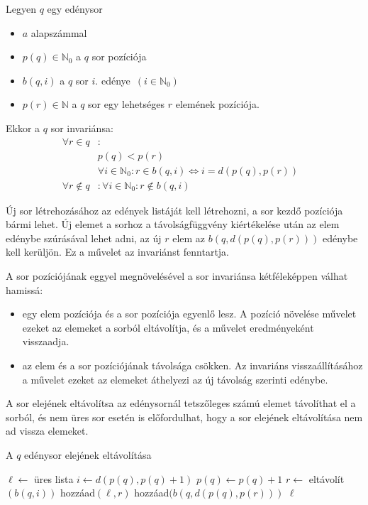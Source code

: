 Legyen $q$ egy edénysor
\begin{itemize}
\item $a$ alapszámmal
\item $p(q) \in \mathbb{N}_0$ a $q$ sor pozíciója
\item $b(q, i)$ a $q$ sor $i$. edénye\ $(i \in \mathbb{N}_0)$
\item $p(r) \in \mathbb{N}$ a $q$ sor egy lehetséges $r$ elemének pozíciója.
\end{itemize}
Ekkor a $q$ sor invariánsa:
\begin{align*}
\forall r \in q &: &\\ 
	& p(q) < p(r) \\
	& \forall i \in \mathbb{N}_0: r \in b(q, i) \iff i=d(p(q), p(r)) \\
\forall r \not\in q &: \forall i \in \mathbb{N}_0: r \not\in b(q, i)
\end{align*}

Új sor létrehozásához az edények listáját kell létrehozni, a sor kezdő pozíciója bármi lehet.
Új elemet a sorhoz a távolságfüggvény kiértékelése után az elem edénybe szúrásával lehet adni,
az új $r$ elem az $b(q, d(p(q), p(r)))$ edénybe kell kerüljön.
Ez a művelet az invariánst fenntartja.

A sor pozíciójának eggyel megnövelésével a sor invariánsa kétféleképpen válhat hamissá:
\begin{itemize}
\item egy elem pozíciója és a sor pozíciója egyenlő lesz. A pozíció növelése művelet ezeket az elemeket a sorból eltávolítja, és a művelet eredményeként visszaadja.
\item az elem és a sor pozíciójának távolsága csökken. Az invariáns visszaállításához a művelet ezeket az elemeket áthelyezi az új távolság szerinti edénybe.
\end{itemize}
A sor elejének eltávolítsa az edénysornál tetszőleges számú elemet távolíthat el a sorból, és nem üres sor esetén is előfordulhat, hogy a sor elejének eltávolítása nem ad vissza elemeket.

\begin{algorithm}[H]
\caption{A $q$ edénysor elejének eltávolítása}
\label{alg:buckets-remove-min}
\begin{algorithmic}[1]
	\State $\ell \gets$ üres lista
	\State $i \gets d(p(q), p(q)+1)$
	\State $p(q) \gets p(q)+1$
		\State $r \gets$ eltávolít$(b(q, i))$
			\State hozzáad$(\ell, r)$
		\Else
			\State hozzáad$(b(q, d(p(q), p(r)))$
		\EndIf
	\EndWhile
	\State \Return $\ell$
\EndFunction
\end{algorithmic}
\end{algorithm}

